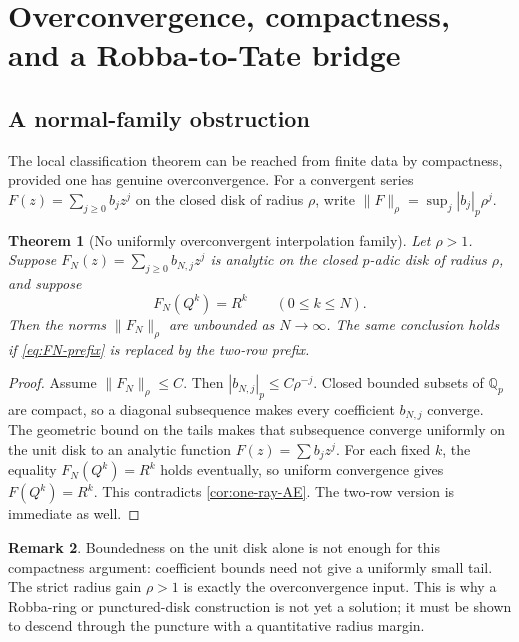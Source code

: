\documentclass[11pt,oneside]{article}
\newtheorem{theorem}{Theorem}[section]
\theoremstyle{definition}
\newtheorem{remark}[theorem]{Remark}
\newcommand{\Qp}{\mathbb Q_p}
\begin{document}
\section{Overconvergence, compactness, and a Robba-to-Tate bridge}
\label{sec:overconvergence}

\subsection{A normal-family obstruction}

The local classification theorem can be reached from finite data by compactness, provided
one has genuine overconvergence.
For a convergent series $F(z)=\sum_{j\ge0}b_jz^j$ on the closed disk of radius
$\rho$, write $\lVert F\rVert_\rho=\sup_j |b_j|_p\rho^j$.

\begin{theorem}[No uniformly overconvergent interpolation family]
\label{thm:no-overconvergent-family}
Let $\rho>1$.  Suppose $F_N(z)=\sum_{j\ge0}b_{N,j}z^j$ is analytic on the closed
$p$-adic disk of radius $\rho$, and suppose
\begin{equation}\label{eq:FN-prefix}
 F_N(Q^k)=R^k\qquad(0\le k\le N).
\end{equation}
Then the norms $\lVert F_N\rVert_\rho$ are unbounded as $N\to\infty$.
The same conclusion holds if \eqref{eq:FN-prefix} is replaced by the two-row prefix.
\end{theorem}

\begin{proof}
Assume $\lVert F_N\rVert_\rho\le C$.  Then
$|b_{N,j}|_p\le C\rho^{-j}$.  Closed bounded subsets of $\Qp$ are compact, so a diagonal
subsequence makes every coefficient $b_{N,j}$ converge.  The geometric bound on the tails
makes that subsequence converge uniformly on the unit disk to an analytic function
$F(z)=\sum b_jz^j$.  For each fixed $k$, the equality $F_N(Q^k)=R^k$ holds eventually, so
uniform convergence gives $F(Q^k)=R^k$.  This contradicts
\cref{cor:one-ray-AE}.  The two-row version is immediate as well.
\end{proof}

\begin{remark}
Boundedness on the unit disk alone is not enough for this compactness argument: coefficient
bounds need not give a uniformly small tail.  The strict radius gain $\rho>1$ is exactly the
overconvergence input.  This is why a Robba-ring or punctured-disk construction is not yet a
solution; it must be shown to descend through the puncture with a quantitative radius margin.
\end{remark}
\end{document}
